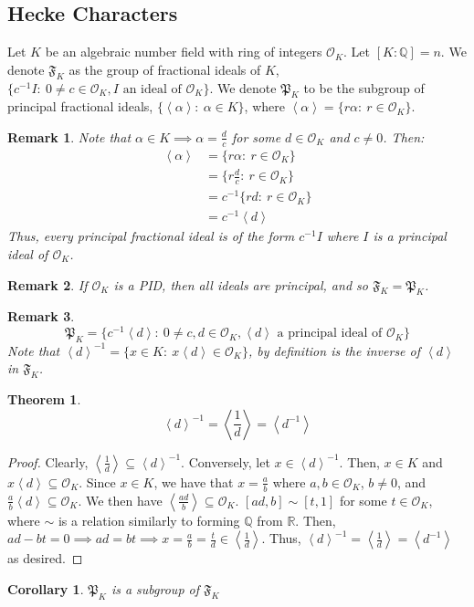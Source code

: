 \documentclass{article}
\newcommand{\R}{\mathbb{R}}
\newcommand{\la}{\left\langle}
\newcommand{\ra}{\right\rangle}
\newcommand{\air}{\mathcal{O}_K}
\newcommand{\Q}{\mathbb{Q}}
\newtheorem{theorem}{Theorem}[subsection]
\newtheorem{remark}{Remark}[subsection]
\newtheorem{cor}{Corollary}[subsection]
\begin{document}
\subsection{Hecke Characters}
Let $K$ be an algebraic number field with ring of integers $\air$. Let $[K:\Q]=n$. We denote $\mathfrak{F}_K$ as the group of fractional ideals of $K$, $\{c^{-1}I:\ 0\neq c\in\air, I\text{ an ideal of }\air\}$. We denote $\mathfrak{P}_K$ to be the subgroup of principal fractional ideals, $\{\la\alpha\ra:\ \alpha\in K\}$, where $\la\alpha\ra =\{r\alpha:\ r\in\air\}$.
\begin{remark}
Note that $\alpha\in K\implies \alpha=\frac{d}{c}$ for some $d\in\air$ and $c\neq 0$. Then:
\begin{align*}
    \la\alpha\ra &= \{r\alpha:\ r\in \air\}\\
    &=\{r\frac{d}{c}:\ r\in\air\}\\
    &= c^{-1}\{rd:\ r\in \air\}\\
    &=c^{-1}\la d\ra 
\end{align*}
Thus, every principal fractional ideal is of the form $c^{-1}I$ where $I$ is a principal ideal of $\air$.
\end{remark}
\begin{remark}
If $\air$ is a PID, then all ideals are principal, and so $\mathfrak{F}_K=\mathfrak{P}_K$.
\end{remark}
\begin{remark}
$$\mathfrak{P}_K=\{c^{-1}\la d\ra:\ 0\neq c,d\in\air,\la d\ra \text{ a principal ideal of }\air\}$$
Note that $\la d\ra ^{-1}=\{x\in K:\ x\la d\ra \in\air\}$, by definition is the inverse of $\la d\ra$ in $\mathfrak{F}_K$.
\end{remark}
\begin{theorem}
$$\la d\ra^{-1} = \la \frac{1}{d}\ra = \la d^{-1}\ra$$
\end{theorem}
\begin{proof}
Clearly, $\la\frac{1}{d}\ra \subseteq \la d\ra^{-1}$. Conversely, let $x\in \la d\ra^{-1}$. Then, $x\in K$ and $x\la d\ra \subseteq\air$. Since $x\in K$, we have that $x=\frac{a}{b}$ where $a,b\in\air$, $b\neq 0$, and $\frac{a}{b}\la d\ra\subseteq \air$. We then have $\la \frac{ad}{b}\ra\subseteq \air$. $[ad,b]\sim [t,1]$ for some $t\in\air$, where $\sim$ is a relation similarly to forming $\Q$ from $\R$. Then, $ad-bt=0\implies ad=bt\implies x=\frac{a}{b}=\frac{t}{d}\in\la\frac{1}{d}\ra$. Thus, $\la d\ra^{-1}=\la\frac{1}{d}\ra = \la d^{-1}\ra$ as desired.
\end{proof}
\begin{cor}
$\mathfrak{P}_K$ is a subgroup of $\mathfrak{F}_K$
\end{cor}
\end{document}
